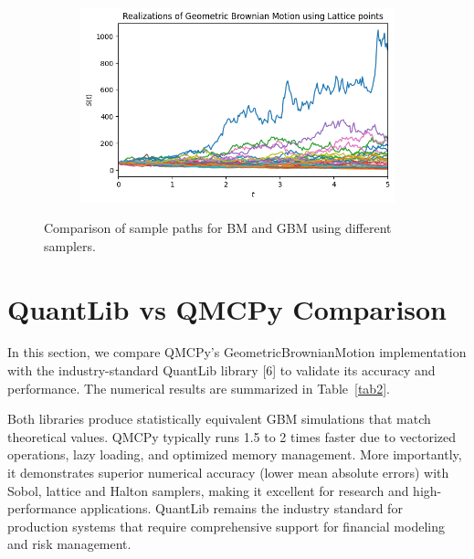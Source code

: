 \documentclass{article}
\begin{document}
\begin{figure}[tbp]
\begin{subfigure}[b]{0.49\textwidth}
\caption{}
\label{fig:bm_lattice}
\end{subfigure}
\hfill
\begin{subfigure}[b]{0.49\textwidth}
\includegraphics[width=\textwidth]{images/figure_4.png}
\caption{}
\label{fig:gbm_lattice}
\end{subfigure}
\caption{Comparison of sample paths for BM and GBM using different samplers.}
\label{fig:bm_gbm_paths}
\end{figure}

\section{QuantLib vs QMCPy Comparison}

In this section, we compare QMCPy's GeometricBrownianMotion implementation with the industry-standard QuantLib library [6] to validate its accuracy and performance. %
The numerical results are summarized in Table~\ref{tab2}. 

Both libraries produce statistically equivalent GBM simulations that match theoretical values. QMCPy typically runs 1.5 to 2 times faster due to vectorized operations, lazy loading, and optimized memory management. More importantly, it demonstrates superior numerical accuracy (lower mean absolute errors) with Sobol, lattice and Halton samplers, making it excellent for research and high-performance applications. QuantLib remains the industry standard for production systems that require comprehensive support for financial modeling and risk management.

\end{document}
